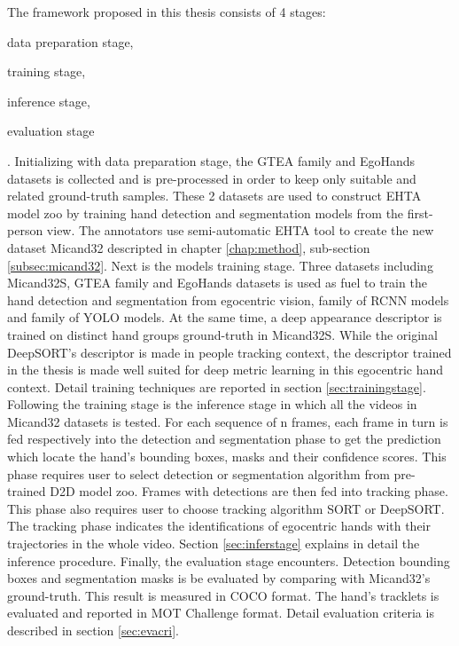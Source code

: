 The framework proposed in this thesis consists of 4 stages: \begin{enumerate*}
	\item data preparation stage,
	\item training stage,
	\item inference stage,
	\item evaluation stage
\end{enumerate*}. Initializing with data preparation stage, the GTEA family and EgoHands datasets is collected and is pre-processed in order to keep only suitable and related ground-truth samples. These 2 datasets are used to construct EHTA model zoo by training hand detection and segmentation models from the first-person view. The annotators use semi-automatic EHTA tool to create the new dataset Micand32 descripted in chapter \ref{chap:method}, sub-section \ref{subsec:micand32}. Next is the models training stage. Three datasets including Micand32S, GTEA family and EgoHands datasets is used as fuel to train the hand detection and segmentation from egocentric vision, family of RCNN models and family of YOLO models. At the same time, a deep appearance descriptor is trained on distinct hand groups ground-truth in Micand32S. While the original DeepSORT's descriptor is made in people tracking context, the descriptor trained in the thesis is made well suited for deep metric learning in this egocentric hand context. Detail training techniques are reported in section \ref{sec:trainingstage}. Following the training stage is the inference stage in which all the videos in Micand32 datasets is tested. For each sequence of n frames, each frame in turn is fed respectively into the detection and segmentation phase to get the prediction which locate the hand’s bounding boxes, masks and their confidence scores. This phase requires user to select detection or segmentation algorithm from pre-trained D2D model zoo. Frames with detections are then fed into tracking phase. This phase also requires user to choose tracking algorithm SORT or DeepSORT. The tracking phase indicates the identifications of egocentric hands with their trajectories in the whole video. Section \ref{sec:inferstage} explains in detail the inference procedure. Finally, the evaluation stage encounters. Detection bounding boxes and segmentation masks is be evaluated by comparing with Micand32’s ground-truth. This result is measured in COCO format. The hand’s tracklets is evaluated and reported in MOT Challenge format. Detail evaluation criteria is described in section \ref{sec:evacri}. 
